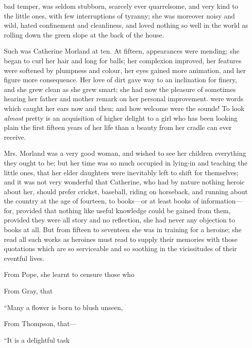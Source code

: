 bad temper, was seldom stubborn, scarcely ever quarrelsome, and very kind to the little ones, with few interruptions of tyranny; she was moreover noisy and wild, hated confinement and cleanliness, and loved nothing so well in the world as rolling down the green slope at the back of the house.

Such was Catherine Morland at ten. At fifteen, appearances were mending; she began to curl her hair and long for balls; her complexion improved, her features were softened by plumpness and colour, her eyes gained more animation, and her figure more consequence. Her love of dirt gave way to an inclination for finery, and she grew clean as she grew smart; she had now the pleasure of sometimes hearing her father and mother remark on her personal improvement.  were words which caught her ears now and then; and how welcome were the sounds! To look {\em almost} pretty is an acquisition of higher delight to a girl who has been looking plain the first fifteen years of her life than a beauty from her cradle can ever receive.

Mrs. Morland was a very good woman, and wished to see her children everything they ought to be; but her time was so much occupied in lying-in and teaching the little ones, that her elder daughters were inevitably left to shift for themselves; and it was not very wonderful that Catherine, who had by nature nothing heroic about her, should prefer cricket, baseball, riding on horseback, and running about the country at the age of fourteen, to books---or at least books of information---for, provided that nothing like useful knowledge could be gained from them, provided they were all story and no reflection, she had never any objection to books at all. But from fifteen to seventeen she was in training for a heroine; she read all such works as heroines must read to supply their memories with those quotations which are so serviceable and so soothing in the vicissitudes of their eventful lives.

From Pope, she learnt to censure those who


From Gray, that

“Many a flower is born to blush unseen,\crlf
{}

From Thompson, that---

“It is a delightful task\crlf
{}

